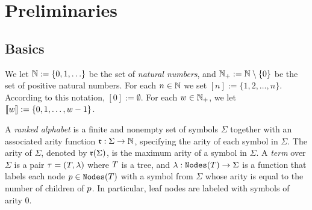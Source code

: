 \section{Preliminaries}

\subsection{Basics}
We let $\mathbb{N}:= \{0,1, \ldots \}$ be the set of {\em natural numbers}, 
and $\mathbb{N}_+:= \mathbb{N} \setminus \{0\}$ be the set of positive natural numbers. 
For each $n \in \mathbb{N}$ we set $[n]:=\{1,2, \ldots,n\}$. According to this notation,
$[0]:= \emptyset$. For each $w \in \mathbb{N}_+$, we let $\llbracket w \rrbracket:= \{0,1,\ldots,
w-1\}$. 

A \emph{ranked alphabet} is a finite and nonempty set of symbols $\Sigma$ together with an associated arity function $\mathfrak{r} : \Sigma \rightarrow \mathbb{N}$, specifying the arity of each symbol in $\Sigma$. The arity of $\Sigma$, denoted by $\mathfrak{r}(\Sigma)$, is the
maximum arity of a symbol in $\Sigma$. A \emph{term} over $\Sigma$ is a pair $\tau = (T, \lambda)$ where $T$ is a tree, and $\lambda: \texttt{Nodes}(T) \rightarrow \Sigma$ is a function that labels each node $p \in \texttt{Nodes}(T)$ with a symbol from $\Sigma$ whose arity is equal to the number of children of $p$. In particular, leaf nodes are labeled with symbols of arity $0$. 


